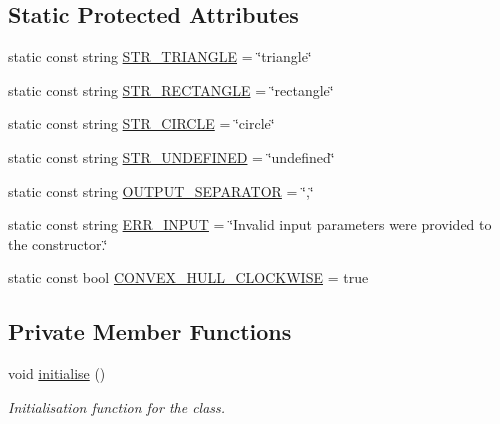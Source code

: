 \subsection*{Static Protected Attributes}
\begin{DoxyCompactItemize}
\item 
static const string \hyperlink{classmultiscale_1_1analysis_1_1SpatialCollection2D_ae666d6dc811ea20b7ce3cf2a66476fc1}{S\-T\-R\-\_\-\-T\-R\-I\-A\-N\-G\-L\-E} = \char`\"{}triangle\char`\"{}
\item 
static const string \hyperlink{classmultiscale_1_1analysis_1_1SpatialCollection2D_ad98d817f86185eb9c7f0d061b9c40cce}{S\-T\-R\-\_\-\-R\-E\-C\-T\-A\-N\-G\-L\-E} = \char`\"{}rectangle\char`\"{}
\item 
static const string \hyperlink{classmultiscale_1_1analysis_1_1SpatialCollection2D_acf997f52cf871815e519a460336e3631}{S\-T\-R\-\_\-\-C\-I\-R\-C\-L\-E} = \char`\"{}circle\char`\"{}
\item 
static const string \hyperlink{classmultiscale_1_1analysis_1_1SpatialCollection2D_afce51890a0eebb60c5622a39485c2d2a}{S\-T\-R\-\_\-\-U\-N\-D\-E\-F\-I\-N\-E\-D} = \char`\"{}undefined\char`\"{}
\item 
static const string \hyperlink{classmultiscale_1_1analysis_1_1SpatialCollection2D_a489bef8926aecc45acb7f54d8802def1}{O\-U\-T\-P\-U\-T\-\_\-\-S\-E\-P\-A\-R\-A\-T\-O\-R} = \char`\"{},\char`\"{}
\item 
static const string \hyperlink{classmultiscale_1_1analysis_1_1SpatialCollection2D_ae6688ddf08e23397e0798e4280d7f1ab}{E\-R\-R\-\_\-\-I\-N\-P\-U\-T} = \char`\"{}Invalid input parameters were provided to the constructor.\char`\"{}
\item 
static const bool \hyperlink{classmultiscale_1_1analysis_1_1SpatialCollection2D_aa379350e6bee0f58f380152048aa4c21}{C\-O\-N\-V\-E\-X\-\_\-\-H\-U\-L\-L\-\_\-\-C\-L\-O\-C\-K\-W\-I\-S\-E} = true
\end{DoxyCompactItemize}
\subsection*{Private Member Functions}
\begin{DoxyCompactItemize}
\item 
void \hyperlink{classmultiscale_1_1analysis_1_1SpatialCollection2D_ae128b71f769a10ff5bc7452e2ec9d555}{initialise} ()
\begin{DoxyCompactList}\small\item\em Initialisation function for the class. \end{DoxyCompactList}\end{DoxyCompactItemize}


